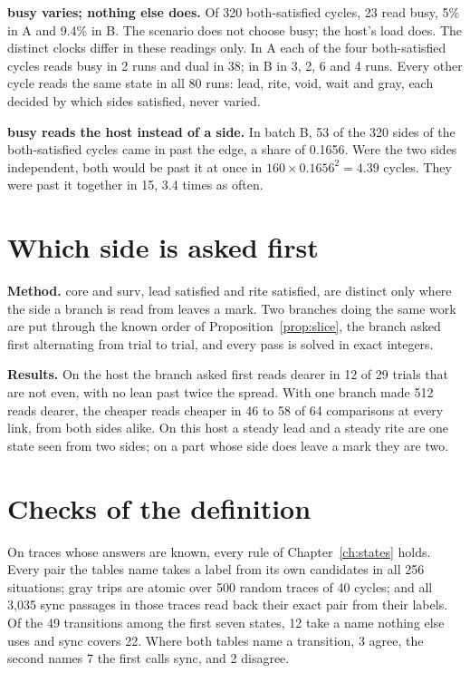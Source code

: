 \textbf{busy varies; nothing else does.} Of 320 both-satisfied cycles, 23 read busy, 5\% in A and 9.4\%
in B. The scenario does not choose busy; the host's load does. The distinct clocks differ in these
readings only. In A each of the four both-satisfied cycles reads busy in 2 runs and dual in 38; in B in
3, 2, 6 and 4 runs. Every other cycle reads the same state in all 80 runs: lead, rite, void, wait
and gray, each decided by which sides satisfied, never varied.

\textbf{busy reads the host instead of a side.} In batch B, 53 of the 320 sides of the both-satisfied cycles
came in past the edge, a share of 0.1656. Were the two sides independent, both would be past it at
once in \(160 \times 0.1656^2 = 4.39\) cycles. They were past it together in 15, 3.4 times as often.

\section{Which side is asked first}
\label{sec:side}

\textbf{Method.} core and surv, lead satisfied and rite satisfied, are distinct only where the side a branch
is read from leaves a mark. Two branches doing the same work are put through the known order of
Proposition~\ref{prop:slice}, the branch asked first alternating from trial to trial, and every
pass is solved in exact integers.

\textbf{Results.} On the host the branch asked first reads dearer in 12 of 29 trials that are not
even, with no lean past twice the spread. With one branch made 512 reads dearer, the cheaper reads
cheaper in 46 to 58 of 64 comparisons at every link, from both sides alike. On this host a steady
lead and a steady rite are one state seen from two sides; on a part whose side does leave a mark
they are two.

\section{Checks of the definition}

On traces whose answers are known, every rule of Chapter~\ref{ch:states} holds. Every pair the
tables name takes a label from its own candidates in all 256 situations; gray trips are atomic
over 500 random traces of 40 cycles; and all 3,035 sync passages in those traces read back their
exact pair from their labels. Of the 49 transitions among the first seven states, 12 take a name
nothing else uses and sync covers 22. Where both tables name a transition, 3 agree, the second
names 7 the first calls sync, and 2 disagree.
